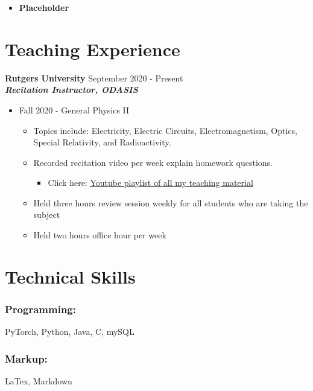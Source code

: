 \documentclass{article}
\begin{document}
\begin{itemize}
  \itemsep0em
  \item \textbf{Placeholder}
\end{itemize}


\section{Teaching Experience}
\textbf{Rutgers University}
\hfill{September 2020 - Present}\\
\textit{\textbf{Recitation Instructor, ODASIS}}
\begin{itemize}
  \item Fall 2020 - General Physics II
  \begin{itemize}
  	\item Topics include: Electricity, Electric Circuits, Electromagnetism, Optics, Special Relativity, and Radioactivity.
     \item Recorded recitation video per week explain homework questions.
     \begin{itemize}
		\item Click here: \href{https://www.youtube.com/playlist?list=PLhDL674NFL2ggH1tSbZzek3hs83dwfa25}{Youtube playlist of all my teaching material}
     \end{itemize}
     \item Held three hours review session weekly for all students who are taking the subject
 	 \item Held two hours office hour per week
  \end{itemize}
\end{itemize}


\section{Technical Skills}

\subsubsection{Programming:}

PyTorch, Python, Java, C, mySQL

\subsubsection{Markup:}

LaTex, Markdown
\end{document}

